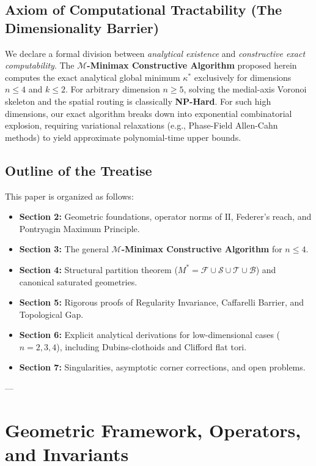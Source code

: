 \documentclass[11pt,reqno]{amsart}
\theoremstyle{definition}
\providecommand{\II}{\mathrm{I\!I}}
\numberwithin{equation}{section}
\providecommand{\II}{\mathrm{II}}
\begin{document}
\subsection{Axiom of Computational Tractability (The Dimensionality Barrier)}
We declare a formal division between \emph{analytical existence} and \emph{constructive exact computability}. The \textbf{$\mathcal{M}$-Minimax Constructive Algorithm} proposed herein computes the exact analytical global minimum $\kappa^*$ exclusively for dimensions $n \le 4$ and $k \le 2$. For arbitrary dimension $n \ge 5$, solving the medial-axis Voronoi skeleton and the spatial routing is classically \textbf{NP-Hard}. For such high dimensions, our exact algorithm breaks down into exponential combinatorial explosion, requiring variational relaxations (e.g., Phase-Field Allen-Cahn methods) to yield approximate polynomial-time upper bounds.

\subsection{Outline of the Treatise}
This paper is organized as follows:
\begin{itemize}
    \item \textbf{Section 2:} Geometric foundations, operator norms of $\II$, Federer's reach, and Pontryagin Maximum Principle.
    \item \textbf{Section 3:} The general \textbf{$\mathcal{M}$-Minimax Constructive Algorithm} for $n \le 4$.
    \item \textbf{Section 4:} Structural partition theorem ($M^* = \mathcal{F} \cup \mathcal{S} \cup \mathcal{T} \cup \mathcal{B}$) and canonical saturated geometries.
    \item \textbf{Section 5:} Rigorous proofs of Regularity Invariance, Caffarelli Barrier, and Topological Gap.
    \item \textbf{Section 6:} Explicit analytical derivations for low-dimensional cases ($n=2, 3, 4$), including Dubins-clothoids and Clifford flat tori.
    \item \textbf{Section 7:} Singularities, asymptotic corner corrections, and open problems.
\end{itemize}

---

\section{Geometric Framework, Operators, and Invariants}
\end{document}
